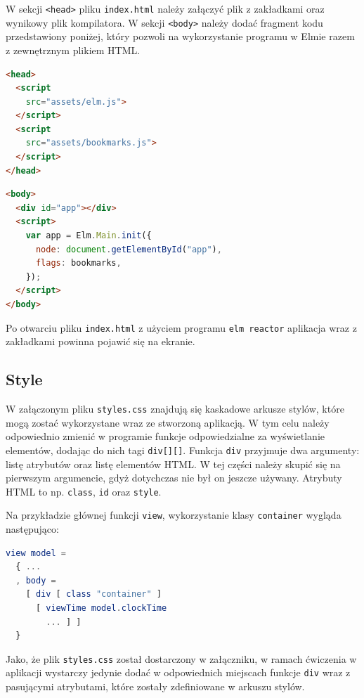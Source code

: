 \documentclass[twoside,a4paper]{report}
\begin{document}
W sekcji \texttt{<head>} pliku \texttt{index.html} należy załączyć plik z zakładkami oraz wynikowy plik kompilatora.
W sekcji \texttt{<body>} należy dodać fragment kodu przedstawiony poniżej, który pozwoli na wykorzystanie programu w Elmie razem z zewnętrznym plikiem HTML\@.

\noindent
\begin{minipage}{.41\textwidth}
\begin{lstlisting}[language=html]
<head>
  <script
    src="assets/elm.js">
  </script>
  <script
    src="assets/bookmarks.js">
  </script>
</head>
\end{lstlisting}
\end{minipage}\hfill
\begin{minipage}{.55\textwidth}
\begin{lstlisting}[language=html]
<body>
  <div id="app"></div>
  <script>
    var app = Elm.Main.init({
      node: document.getElementById("app"),
      flags: bookmarks,
    });
  </script>
</body>
\end{lstlisting}
\end{minipage}\hfill

Po otwarciu pliku \texttt{index.html} z użyciem programu \texttt{elm reactor} aplikacja wraz z zakładkami powinna pojawić się na ekranie.

\subsection{Style}
W załączonym pliku \texttt{styles.css} znajdują się kaskadowe arkusze stylów, które mogą zostać wykorzystane wraz ze stworzoną aplikacją.
W tym celu należy odpowiednio zmienić w programie funkcje odpowiedzialne za wyświetlanie elementów, dodając do nich tagi \texttt{div[][]}.
Funkcja \texttt{div} przyjmuje dwa argumenty: listę atrybutów oraz listę elementów HTML\@.
W tej części należy skupić się na pierwszym argumencie, gdyż dotychczas nie był on jeszcze używany.
Atrybuty HTML to np. \texttt{class}, \texttt{id} oraz \texttt{style}.

Na przykładzie głównej funkcji \texttt{view}, wykorzystanie klasy \texttt{container} wygląda następująco:
\begin{lstlisting}[language=Elm]
view model =
  { ...
  , body =
    [ div [ class "container" ]
      [ viewTime model.clockTime
        ... ] ]
  }
\end{lstlisting}

Jako, że plik \texttt{styles.css} został dostarczony w załączniku, w ramach ćwiczenia w aplikacji wystarczy jedynie dodać w odpowiednich miejscach funkcje \texttt{div} wraz z pasującymi atrybutami, które zostały zdefiniowane w arkuszu stylów.
\end{document}
